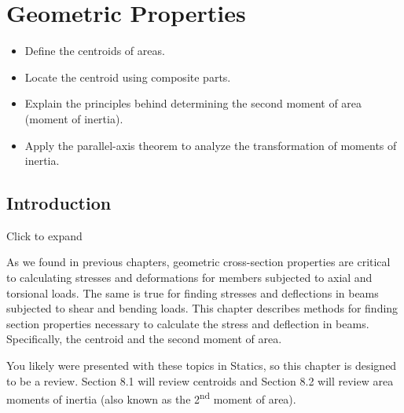 \documentclass[
  letterpaper,
  DIV=11,
  numbers=noendperiod]{scrreprt}
\providecommand{\tightlist}{%
  \setlength{\itemsep}{0pt}\setlength{\parskip}{0pt}}\usepackage{longtable,booktabs,array}
\theoremstyle{definition}
\theoremstyle{remark}
\begin{document}

\chapter{Geometric Properties}\label{sec-geometric-properties}

\begin{tcolorbox}[enhanced jigsaw, leftrule=.75mm, colbacktitle=quarto-callout-note-color!10!white, breakable, opacityback=0, colback=white, titlerule=0mm, toprule=.15mm, colframe=quarto-callout-note-color-frame, coltitle=black, title={Learning Objectives}, toptitle=1mm, bottomrule=.15mm, rightrule=.15mm, left=2mm, arc=.35mm, opacitybacktitle=0.6, bottomtitle=1mm]

\begin{itemize}
\tightlist
\item
  Define the centroids of areas.
\item
  Locate the centroid using composite parts.
\item
  Explain the principles behind determining the second moment of area
  (moment of inertia).
\item
  Apply the parallel-axis theorem to analyze the transformation of
  moments of inertia.
\end{itemize}

\end{tcolorbox}

\section*{Introduction}\label{introduction-7}


Click to expand

As we found in previous chapters, geometric cross-section properties are
critical to calculating stresses and deformations for members subjected
to axial and torsional loads. The same is true for finding stresses and
deflections in beams subjected to shear and bending loads. This chapter
describes methods for finding section properties necessary to calculate
the stress and deflection in beams. Specifically, the centroid and the
second moment of area.

You likely were presented with these topics in Statics, so this chapter
is designed to be a review. Section 8.1 will review centroids and
Section 8.2 will review area moments of inertia (also known as the
2\textsuperscript{nd} moment of area).
\end{document}
